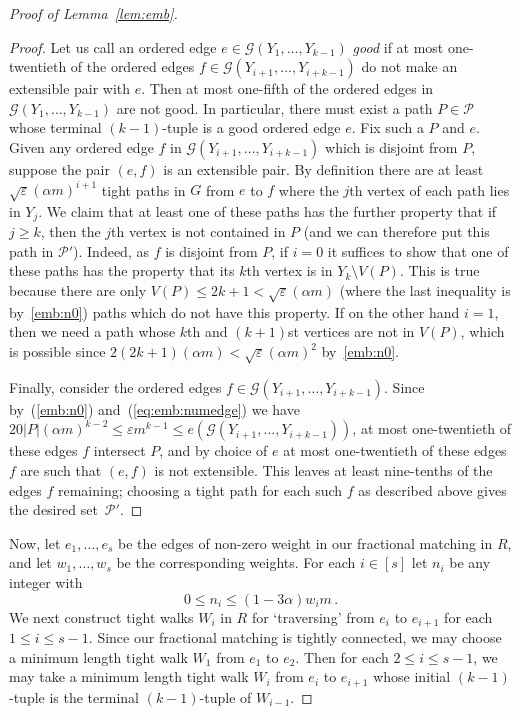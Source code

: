 \documentclass[12pt,a4paper]{amsart}
\let\eps\varepsilon
\newcommand{\oldqed}{}
\def\endofClaim{\hfill\scalebox{.6}{$\Box$}}
\newenvironment{claimproof}[1][Proof]{
  \renewcommand{\oldqed}{\qedsymbol}
  \renewcommand{\qedsymbol}{\endofClaim}
  \begin{proof}[#1]
}{
  \end{proof}
  \renewcommand{\qedsymbol}{\oldqed}
}
\newcommand{\cG}{\mathcal{G}}
\newcommand{\paths}{\mathscr{P}}
\begin{document}
\begin{proof}[Proof of Lemma~\ref{lem:emb}]
\begin{claimproof}
Let us call an ordered edge $e\in
  \cG(Y_{1},\ldots,Y_{k-1})$ \emph{good} if at most one-twentieth of the ordered edges
  $f \in \cG(Y_{i+1},\ldots,Y_{i + k-1})$ do not make an extensible pair with
  $e$. Then at most one-fifth of the ordered edges in $\cG(Y_1,\ldots,Y_{k-1})$ are
  not good. In particular, there must exist a path $P\in\paths$ whose terminal
  $(k-1)$-tuple is a good ordered edge $e$. Fix such a $P$ and $e$. 
Given any ordered edge
  $f$ in $\cG(Y_{i+1},\ldots,Y_{i + k-1})$ which is disjoint from $P$, suppose
  the pair $(e,f)$ is an extensible pair. By definition there are at least
  $\sqrt{\eps} (\alpha m)^{i+1}$ tight paths in $G$ from $e$ to $f$ where the $j$th vertex of each path
  lies in $Y_j$. We claim that at least one of these paths has the further
  property that if $j\ge k$, then the $j$th vertex is not contained in $P$ (and
  we can therefore put this path in $\paths'$). Indeed, as $f$ is disjoint from $P$, if $i=0$ it suffices to show that one of these paths has the property that its $k$th vertex is in $Y_k\setminus V(P)$. This is true because there are only $V(P)\le 2k+1<\sqrt{\eps}(\alpha m)$ (where the last inequality is by~\eqref{emb:n0}) paths which do not have this property. If on the other hand $i=1$, then we need a path whose $k$th and $(k+1)$st vertices are not in $V(P)$, which is possible since $2(2k+1)(\alpha m)<\sqrt{\eps}(\alpha m)^2$ by~\eqref{emb:n0}.

Finally, consider the ordered edges $f \in \cG(Y_{i+1},\ldots,Y_{i + k-1})$. Since by~(\ref{emb:n0}) and~(\ref{eq:emb:numedge}) we have $20 |P| (\alpha m)^{k-2} \leq \eps m^{k-1} \leq e(\cG(Y_{i+1},\ldots,Y_{i + k-1}))$, at most one-twentieth of these edges $f$ intersect $P$, and by choice of $e$ at most one-twentieth of these edges $f$ are such that $(e, f)$ is not extensible. This leaves at least nine-tenths of the edges $f$ remaining; choosing a tight path for each such $f$ as described above gives the desired set~$\paths'$.
 \end{claimproof} 

 Now, let $e_1,\ldots,e_s$ be the edges of non-zero weight in our fractional
 matching in $R$, and let $w_1, \ldots, w_s$ be the corresponding weights. For
 each $i \in [s]$ let $n_i$ be any integer with
 \begin{equation}\label{eq:emb:ni}
  0 \leq n_i \leq (1-3\alpha) w_i m\,.
 \end{equation}
 We next construct tight walks $W_i$ in $R$ for `traversing' from $e_i$ to $e_{i+1}$ for each $1\le i\le s-1$.
 Since our fractional matching is tightly connected, we may choose a minimum
 length tight walk $W_1$ from $e_1$ to $e_2$. 
Then
 for each $2 \le i \le s-1$, we may take a minimum length tight walk $W_i$ from
 $e_i$ to $e_{i+1}$ whose initial $(k-1)$-tuple is the terminal $(k-1)$-tuple of
 $W_{i-1}$.
 

\end{proof}
\end{document}
